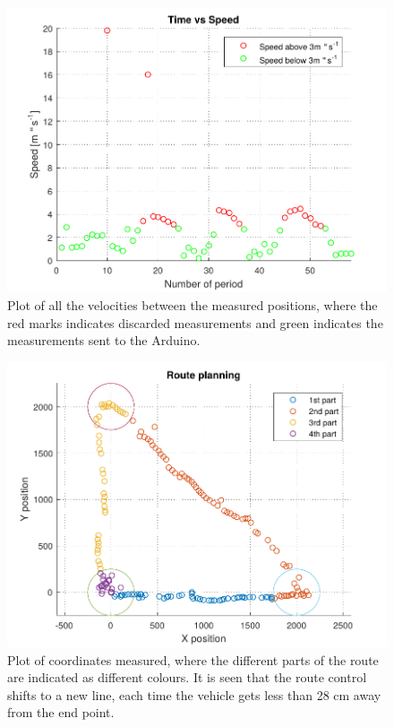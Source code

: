 \begin{figure}[H]
  \centering
	\includegraphics[scale=0.8]{figures/AccTest3.pdf}
	\caption{Plot of all the velocities between the measured positions, where the red marks indicates discarded measurements and green indicates the measurements sent to the Arduino.}
	\label{AccT3fig}
\end{figure}


\begin{figure}[H]
  \centering
	\includegraphics[scale=0.8]{figures/AccTest6.pdf}
	\caption{Plot of coordinates measured, where the different parts of the route are indicated as different colours. It is seen that the route control shifts to a new line, each time the vehicle gets less than 28 cm away from the end point.}
	\label{AccT6fig}
\end{figure}


